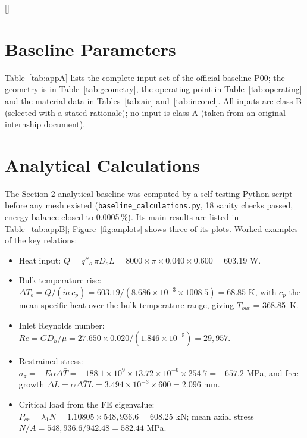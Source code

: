 [\vspace{2pt}\titlerule]
\chapter{Baseline Parameters}\label{app:params}
Table~\ref{tab:appA} lists the complete input set of the official baseline P00; the geometry is in Table~\ref{tab:geometry},
the operating point in Table~\ref{tab:operating} and the material data in Tables~\ref{tab:air} and~\ref{tab:inconel}. All inputs are class B
(selected with a stated rationale); no input is class A (taken from an original internship document).



\chapter{Analytical Calculations}\label{app:analytical}
The Section 2 analytical baseline was computed by a self-testing Python script before any mesh existed (\texttt{baseline\_calculations.py},
18 sanity checks passed, energy balance closed to 0.0005\,\%). Its main results are listed in Table~\ref{tab:appB}; Figure~\ref{fig:anplots}
shows three of its plots. Worked examples of the key relations:

\begin{itemize}
\item Heat input: $Q = q''_o\,\pi D_o L = 8000 \times \pi \times 0.040 \times 0.600 = 603.19$ W.
\item Bulk temperature rise: $\Delta T_b = Q/(\dot m\,\bar c_p) = 603.19/(8.686\times10^{-3} \times 1008.5) = 68.85$ K, with $\bar c_p$ the mean
      specific heat over the bulk temperature range, giving $T_{out}$ = 368.85~K.
\item Inlet Reynolds number: $Re = G D_h/\mu = 27.650 \times 0.020/(1.846\times10^{-5}) = 29{,}957$.
\item Restrained stress: $\sigma_z = -E\alpha\Delta\bar T = -188.1\times10^{9} \times 13.72\times10^{-6} \times 254.7 = -657.2$ MPa, and free growth
      $\Delta L = \alpha\Delta\bar T L = 3.494\times10^{-3} \times 600 = 2.096$ mm.
\item Critical load from the FE eigenvalue: $P_{cr} = \lambda_1 N = 1.10805 \times 548{,}936.6 = 608.25$ kN; mean axial stress
      $N/A = 548{,}936.6/942.48 = 582.44$ MPa.
\end{itemize}

